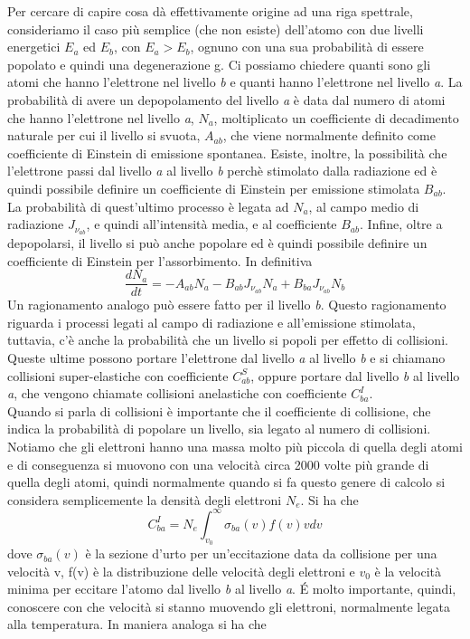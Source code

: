 \documentclass[a4paper,11pt]{article}
\begin{document}
Per cercare di capire cosa dà effettivamente origine ad una riga spettrale, consideriamo il caso più semplice (che non esiste) dell'atomo con due livelli energetici \(E_a\) ed \(E_b\), con \(E_a > E_b\), ognuno con una sua probabilità di essere popolato e quindi una degenerazione g. Ci possiamo chiedere quanti sono gli atomi che hanno l'elettrone nel livello \textit{b} e quanti hanno l'elettrone nel livello \textit{a}. La probabilità di avere un depopolamento del livello \textit{a} è data dal numero di atomi che hanno l'elettrone nel livello \textit{a}, \(N_a\), moltiplicato un coefficiente di decadimento naturale per cui il livello si svuota, \(A_{ab}\), che viene normalmente definito come coefficiente di Einstein di emissione spontanea. Esiste, inoltre, la possibilità che l'elettrone passi dal livello \textit{a} al livello \textit{b} perchè stimolato dalla radiazione ed è quindi possibile definire un coefficiente di Einstein per emissione stimolata \(B_{ab}\). La probabilità di quest'ultimo processo è legata ad \(N_a\), al campo medio di radiazione \(J_{\nu_{ab}}\), e quindi all'intensità media, e al coefficiente \(B_{ab}\). Infine, oltre a depopolarsi, il livello si può anche popolare ed è quindi possibile definire un coefficiente di Einstein per l'assorbimento. In definitiva
\[\frac{dN_a}{dt}= -A_{ab} N_a - B_{ab} J_{\nu_{ab}}N_a + B_{ba} J_{\nu_{ab}}N_b\]
Un ragionamento analogo può essere fatto per il livello \textit{b}. Questo ragionamento riguarda i processi legati al campo di radiazione e all'emissione stimolata, tuttavia, c'è anche la probabilità che un livello si popoli per effetto di collisioni. Queste ultime possono portare l'elettrone dal livello \textit{a} al livello \textit{b} e si chiamano collisioni super-elastiche con coefficiente \(C_{ab}^S\), oppure portare dal livello \textit{b} al livello \textit{a}, che vengono chiamate collisioni anelastiche con coefficiente \(C_{ba}^I\).\\
Quando si parla di collisioni è importante che il coefficiente di collisione, che indica la probabilità di popolare un livello, sia legato al numero di collisioni. Notiamo che gli elettroni hanno una massa molto più piccola di quella degli atomi e di conseguenza si muovono con una velocità circa 2000 volte più grande di quella degli atomi, quindi normalmente quando si fa questo genere di calcolo si considera semplicemente la densità degli elettroni \(N_e\). Si ha che 
\[C_{ba}^I=N_e\int_{v_0}^{\infty}\sigma_{ba}(v)f(v)vdv\] dove \(\sigma_{ba}(v)\) è la sezione d'urto per un'eccitazione data da collisione per una velocità v, f(v) è la distribuzione delle velocità degli elettroni e \(v_0\) è la velocità minima per eccitare l'atomo dal livello \textit{b} al livello \textit{a}. É molto importante, quindi, conoscere con che velocità si stanno muovendo gli elettroni, normalmente legata alla temperatura. In maniera analoga si ha che 
\end{document}

